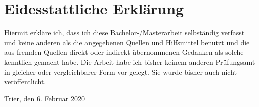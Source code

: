 \thispagestyle{empty}
\par
\chapter*{Eidesstattliche Erklärung}

Hiermit erkläre ich, dass ich diese Bachelor-/Masterarbeit selbständig verfasst und keine anderen als die angegebenen Quellen und Hilfsmittel benutzt und die aus fremden Quellen direkt oder indirekt übernommenen Gedanken als solche kenntlich gemacht habe. Die Arbeit habe ich bisher keinem anderen Prüfungsamt in gleicher oder vergleichbarer Form vor-gelegt. Sie wurde bisher auch nicht veröffentlicht.

Trier, den 6. Februar 2020

\clearpage






